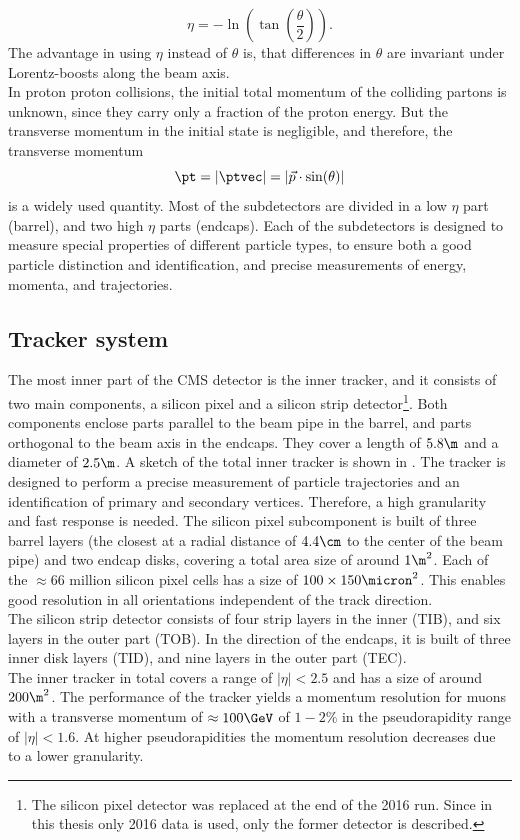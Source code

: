 \begin{equation}
 \eta=-\ln\left(\tan\left(\frac{\theta}{2}\right)\right).
\end{equation}
The advantage in using $\eta$ instead of $\theta$ is, that differences in $\theta$ are invariant under Lorentz-boosts along the beam axis.\\
In proton proton collisions, the initial total momentum of the colliding partons is unknown, since they carry only a fraction of the proton energy. But the transverse momentum in the initial state is negligible, and therefore, the transverse momentum
\begin{equation}
 \pt=|\ptvec|=|\vec{p}\cdot\sin(\theta)|
\end{equation}
is a widely used quantity.
Most of the subdetectors are divided in a low $\eta$ part (barrel), and two high $\eta$ parts (endcaps). Each of the subdetectors is designed to measure special properties of different particle types, to ensure both a good particle distinction and identification, and precise measurements of energy, momenta, and trajectories.



\subsection{Tracker system}
The most inner part of the CMS detector is the inner tracker, and it consists of two main components, a silicon pixel and a silicon strip detector\footnote{The silicon pixel detector was replaced at the end of the 2016 run. Since in this thesis only 2016 data is used, only the former detector is described.}. Both components enclose parts parallel to the beam pipe in the barrel, and parts orthogonal to the beam axis in the endcaps. They cover a length of $5.8\m$ and a diameter of $2.5\m$. A sketch of the total inner tracker is shown in . The tracker is designed to perform a precise measurement of particle trajectories and an identification of primary and secondary vertices. Therefore, a high granularity and fast response is needed. The silicon pixel subcomponent is built of three barrel layers (the closest at a radial distance of $4.4\cm$ to the center of the beam pipe) and two endcap disks, covering a total area size of around $1\m^2$. Each of the $\approx66$ million silicon pixel cells has a size of $100\times150\micron^2$. This enables good resolution in all orientations independent of the track direction.\\
The silicon strip detector consists of four strip layers in the inner (TIB), and six layers in the outer part (TOB). In the direction of the endcaps, it is built of three inner disk layers (TID), and nine layers in the outer part (TEC).\\
The inner tracker in total covers a range of $|\eta|<2.5$ and has a size of around $200\m^2$. The performance of the tracker yields a momentum resolution for muons with a transverse momentum of $\approx100\GeV$ of $1-2\%$ in the pseudorapidity range of $|\eta|<1.6$. At higher pseudorapidities the momentum resolution decreases due to a lower granularity.

